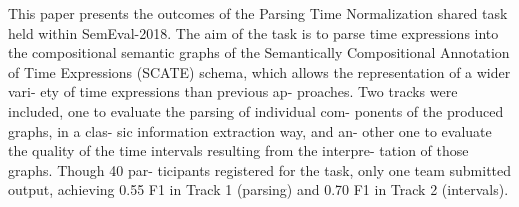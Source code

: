 This paper presents the outcomes of the Parsing Time Normalization shared task held within SemEval-2018. The aim of the task is to parse time expressions into the compositional semantic graphs of the Semantically Compositional Annotation of Time Expressions (SCATE) schema, which allows the representation of a wider vari- ety of time expressions than previous ap- proaches. Two tracks were included, one to evaluate the parsing of individual com- ponents of the produced graphs, in a clas- sic information extraction way, and an- other one to evaluate the quality of the time intervals resulting from the interpre- tation of those graphs. Though 40 par- ticipants registered for the task, only one team submitted output, achieving 0.55 F1 in Track 1 (parsing) and 0.70 F1 in Track 2 (intervals).
